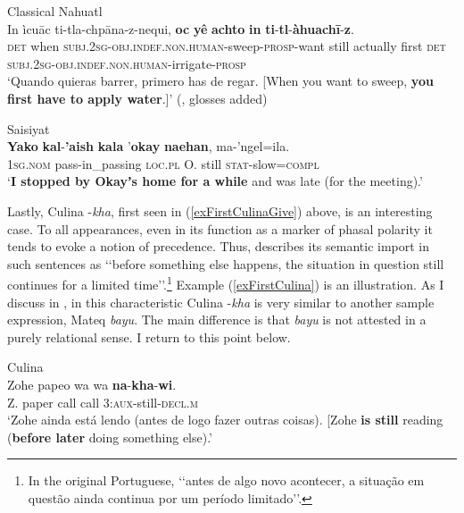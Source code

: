\begin{exe}
	\ex Classical Nahuatl\label{exFirstClassicalNahuatl2}\\
	\gll In ìcuāc ti-tla-chpāna-z-nequi, \textbf{oc} \textbf{yê} \textbf{achto} \textbf{in} \textbf{ti}-\textbf{tl}-\textbf{àhuachī}-\textbf{z}.\\
	\textsc{det} when \textsc{subj}.2\textsc{sg}-\textsc{obj}.\textsc{indef}.\textsc{non}.\textsc{human}-sweep-\textsc{prosp}-want still actually first \textsc{det} \textsc{subj}.2\textsc{sg}-\textsc{obj}.\textsc{indef}.\textsc{non}.\textsc{human}-irrigate-\textsc{prosp}\\
	\glt \lq Quando quieras barrer, primero has de regar. [When you want to sweep, \textbf{you first have to apply water}.]\rq{ }(\cite[502]{Carochi1645}, glosses added)
	
	\ex Saisiyat\label{exFirstSaisiyat}\\
	\gll \textbf{Yako} \textbf{kal}-\textbf{'aish} \textbf{kala} '\textbf{okay} \textbf{naehan}, ma-'ngel=ila.\\
	1\textsc{sg}.\textsc{nom} pass-in\_passing \textsc{loc}.\textsc{pl} O. still \textsc{stat}-slow=\textsc{compl}\\
	\glt \lq \textbf{I stopped by Okayʼs home for a while} and was late (for the meeting).' \parencite[561]{ZeitounEtal2015}
\end{exe}

Lastly, Culina \mbox{-\textit{kha}}, first seen in (\ref{exFirstCulinaGive}) above, is an interesting case. To all appearances, even in its function as a marker of phasal polarity it tends to evoke a notion of precedence. Thus, \textcite[183]{Tiss2004} describes its semantic import in such sentences as \lq\lq before something else happens, the situation in question still continues for a limited time\rq\rq{}.\footnote{In the original Portuguese, \lq\lq  antes de algo novo acontecer, a situação em questão ainda continua por um período limitado\rq\rq{}.} Example (\ref{exFirstCulina}) is an illustration. As I discuss in , in this characteristic Culina \mbox{-\textit{kha}} is very similar to another sample expression, Mateq \textit{bayu}. The main difference is that \textit{bayu} is not attested in a purely relational sense. I return to this point below.

\begin{exe}
	\ex Culina\label{exFirstCulina}\\
	\gll Zohe papeo wa wa  \textbf{na}-\textbf{kha}-\textbf{wi}.\\
	Z. paper call call 3:\textsc{aux}-still-\textsc{decl}.\textsc{m}\\
	\glt \lq Zohe ainda está lendo (antes de logo fazer outras coisas). [Zohe \textbf{is still} reading (\textbf{before later} doing something else).\rq{ }\parencite[184]{Tiss2004} 
\end{exe}

